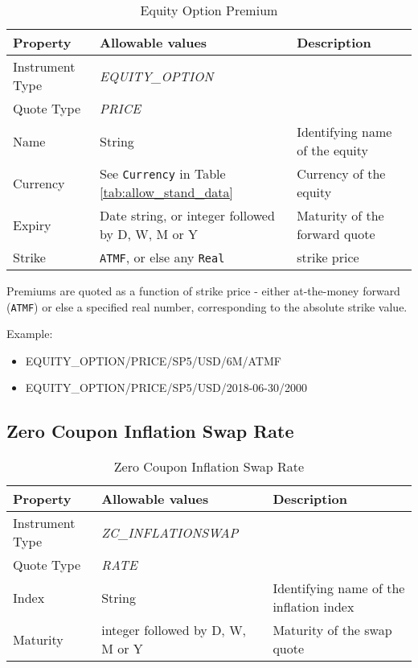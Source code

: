\begin{table}[H]
	\centering
	\begin{tabular}{|p{3cm}|p{3.5cm}|p{7cm}|}
		\hline
		{\bf Property} & {\bf Allowable values} & {\bf Description} \\ \hline
        Instrument Type & \emph{EQUITY\_OPTION} & \\ \hline
        Quote Type & \emph{PRICE} & \\ \hline
        Name & String & Identifying name of the equity \\ \hline
        Currency & See \lstinline!Currency! in Table \ref{tab:allow_stand_data}&  Currency of the equity \\ \hline
        Expiry & Date string, or integer followed by D, W, M or Y & Maturity of the forward quote \\ \hline
        Strike & {\tt ATMF}, or else any {\tt Real} & strike price \\ \hline
	\end{tabular}
	\caption{Equity Option Premium}
	\label{tab:eqpremvol_quote}
\end{table}

Premiums are quoted as a function of strike price - either at-the-money forward ({\tt ATMF}) or else a specified 
real number, corresponding to the absolute strike value.

\medskip
Example:
\begin{itemize}
	\item {EQUITY\_OPTION/PRICE/SP5/USD/6M/ATMF}
	\item {EQUITY\_OPTION/PRICE/SP5/USD/2018-06-30/2000}
\end{itemize}

\subsection{Zero Coupon Inflation Swap Rate}

\begin{table}[H]
    \centering
    \begin{tabular}{|p{3cm}|p{3.5cm}|p{7cm}|}
      \hline
      {\bf Property} & {\bf Allowable values} & {\bf Description} \\ \hline
      Instrument Type & \emph{ZC\_INFLATIONSWAP} & \\ \hline
      Quote Type & \emph{RATE} & \\ \hline
      Index & String & Identifying name of the inflation index \\ \hline
      Maturity & integer followed by D, W, M or Y & Maturity of the swap quote \\ \hline
    \end{tabular}
    \caption{Zero Coupon Inflation Swap Rate}
    \label{tab:zcinflationswap_quote}
\end{table}

